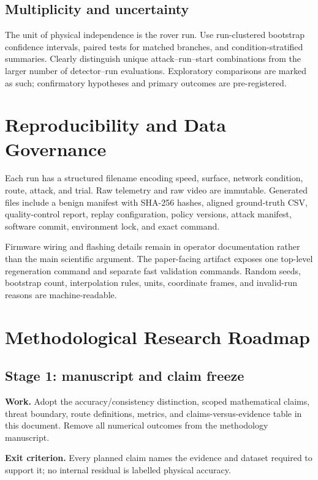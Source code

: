 \documentclass[11pt,a4paper]{article}
\begin{document}
\subsection{Multiplicity and uncertainty}

The unit of physical independence is the rover run. Use run-clustered bootstrap
confidence intervals, paired tests for matched branches, and condition-stratified
summaries. Clearly distinguish unique attack--run--start combinations from the
larger number of detector--run evaluations. Exploratory comparisons are marked
as such; confirmatory hypotheses and primary outcomes are pre-registered.

\section{Reproducibility and Data Governance}

Each run has a structured filename encoding speed, surface, network condition,
route, attack, and trial. Raw telemetry and raw video are immutable. Generated
files include a benign manifest with SHA-256 hashes, aligned ground-truth CSV,
quality-control report, replay configuration, policy versions, attack manifest,
software commit, environment lock, and exact command.

Firmware wiring and flashing details remain in operator documentation rather
than the main scientific argument. The paper-facing artifact exposes one
top-level regeneration command and separate fast validation commands. Random
seeds, bootstrap count, interpolation rules, units, coordinate frames, and
invalid-run reasons are machine-readable.

\section{Methodological Research Roadmap}
\label{sec:roadmap}

\subsection{Stage 1: manuscript and claim freeze}

\textbf{Work.} Adopt the accuracy/consistency distinction, scoped mathematical
claims, threat boundary, route definitions, metrics, and claims-versus-evidence
table in this document. Remove all numerical outcomes from the methodology
manuscript.

\textbf{Exit criterion.} Every planned claim names the evidence and dataset
required to support it; no internal residual is labelled physical accuracy.
\end{document}
